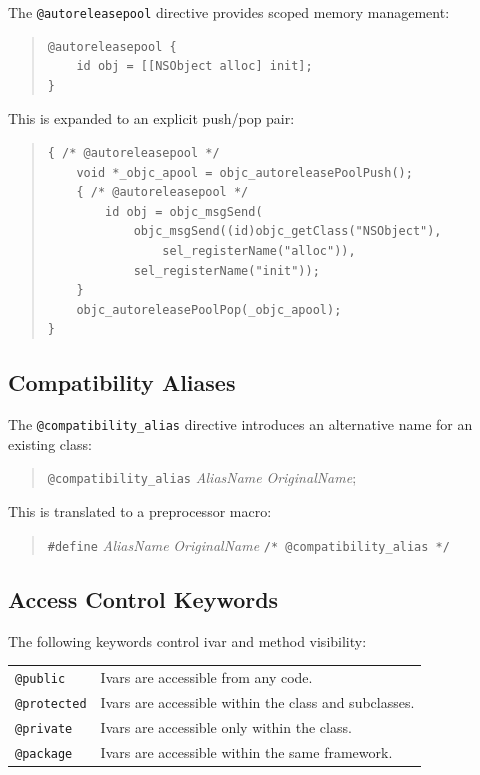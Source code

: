 \documentclass[11pt,twoside]{article}
\newcommand{\meta}[1]{{\itshape #1}}
\begin{document}
The {\tt @autoreleasepool} directive provides scoped memory management:
\begin{quote}
\begin{verbatim}
@autoreleasepool {
    id obj = [[NSObject alloc] init];
}
\end{verbatim}
\end{quote}

This is expanded to an explicit push/pop pair:
\begin{quote}
\begin{verbatim}
{ /* @autoreleasepool */
    void *_objc_apool = objc_autoreleasePoolPush();
    { /* @autoreleasepool */
        id obj = objc_msgSend(
            objc_msgSend((id)objc_getClass("NSObject"),
                sel_registerName("alloc")),
            sel_registerName("init"));
    }
    objc_autoreleasePoolPop(_objc_apool);
}
\end{verbatim}
\end{quote}

\subsection{Compatibility Aliases}

The {\tt @compatibility\_alias} directive introduces an alternative name
for an existing class:
\begin{quote}
{\tt @compatibility\_alias} {\meta{AliasName}} {\meta{OriginalName}};
\end{quote}

This is translated to a preprocessor macro:
\begin{quote}
{\tt \#define} {\meta{AliasName}} {\meta{OriginalName}} \hfill
  {\tt /* @compatibility\_alias */}
\end{quote}

\subsection{Access Control Keywords}

The following keywords control ivar and method visibility:

\medskip
\noindent
\begin{tabularx}{\textwidth}{lX}
{\tt @public}    & Ivars are accessible from any code. \\
{\tt @protected} & Ivars are accessible within the class and subclasses. \\
{\tt @private}   & Ivars are accessible only within the class. \\
{\tt @package}   & Ivars are accessible within the same framework. \\
\end{tabularx}
\end{document}
